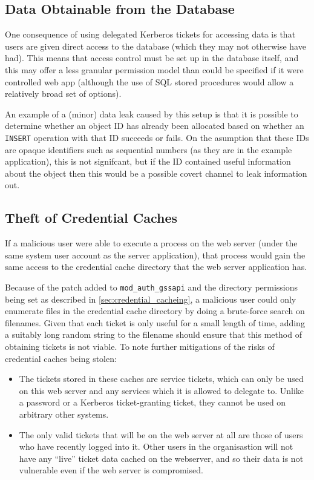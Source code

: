 \documentclass{report}
\begin{document}
\subsection{Data Obtainable from the Database}
One consequence of using delegated Kerberos tickets for accessing data is that users are given direct access to the database (which they may not otherwise have had). This means that access control must be set up in the database itself, and this may offer a less granular permission model than could be specified if it were controlled web app (although the use of SQL stored procedures would allow a relatively broad set of options).

An example of a (minor) data leak caused by this setup is that it is possible to determine whether an object ID has already been allocated based on whether an \texttt{INSERT} operation with that ID succeeds or fails. On the asumption that these IDs are opaque identifiers such as sequential numbers (as they are in the example application), this is not signifcant, but if the ID contained useful information about the object then this would be a possible covert channel to leak information out.

\subsection{Theft of Credential Caches}
\label{sec:theft_of_credential_caches}
If a malicious user were able to execute a process on the web server (under the same system user account as the server application), that process would gain the same access to the credential cache directory that the web server application has.

Because of the patch added to \verb+mod_auth_gssapi+ and the directory permissions being set as described in \autoref{sec:credential_cacheing}, a malicious user could only enumerate files in the credential cache directory by doing a brute-force search on filenames. Given that each ticket is only useful for a small length of time, adding a suitably long random string to the filename should ensure that this method of obtaining tickets is not viable. To note further mitigations of the risks of credential caches being stolen:

\begin{itemize}
\item
  The tickets stored in these caches are service tickets, which can only be used on this web server and any services which it is allowed to delegate to. Unlike a password or a Kerberos ticket-granting ticket, they cannot be used on arbitrary other systems.
\item
  The only valid tickets that will be on the web server at all are those of users who have recently logged into it. Other users in the organisastion will not have any ``live'' ticket data cached on the webserver, and so their data is not vulnerable even if the web server is compromised.
\end{itemize}
\end{document}
